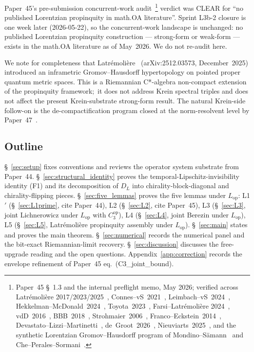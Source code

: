 \documentclass[11pt,a4paper]{article}
\theoremstyle{plain}
\theoremstyle{definition}
\newcommand{\DL}{D_{L}}
\newcommand{\Lop}{L_{\mathrm{op}}}
\newcommand{\Cthreeop}{C_{3}^{\mathrm{op}}}
\begin{document}
Paper~45's pre-submission concurrent-work
audit~\footnote{Paper~45 \S~1.3 and the internal preflight memo, May
2026; verified across Latr\'emoli\`ere
2017/2023/2025~\cite{latremoliere_metric_st_2017,latremoliere2018,farsi_latremoliere2025},
Connes--vS~2021~\cite{connes_vs2021}, Leimbach--vS~2024~\cite{leimbach_vs2024},
Hekkelman--McDonald~2024~\cite{hekkelman_mcdonald2024b},
Toyota~2023~\cite{toyota2023}, Farsi--Latr\'emoli\`ere
2024~\cite{farsi_latremoliere2024}, vdD~2016~\cite{vandungen2016},
BBB~2018~\cite{bizi_brouder_besnard2018}, Strohmaier~2006~\cite{strohmaier2006},
Franco--Eckstein~2014~\cite{franco_eckstein2014},
Devastato--Lizzi--Martinetti~\cite{devastato_lizzi_martinetti2018},
de~Groot~2026~\cite{de_groot2026_su11},
Nieuviarts~2025~\cite{nieuviarts2025a,nieuviarts2025b_proceedings}, and
the synthetic Lorentzian Gromov--Hausdorff program of
Mondino--S\"amann~\cite{minguzzi_suhr2024,mondino_samann2025} and
Che--Perales--Sormani~\cite{che_perales_sormani2025}.}
verdict was CLEAR for ``no published Lorentzian propinquity in math.OA
literature''. Sprint L3b-2 closure is one week later (2026-05-22), so
the concurrent-work landscape is unchanged: no published Lorentzian
propinquity construction --- strong-form or weak-form --- exists in the
math.OA literature as of May~2026. We do not re-audit here.

We note for completeness that
Latr\'emoli\`ere~\cite{latremoliere2025_hypertopology}
(arXiv:2512.03573, December~2025) introduced an inframetric
Gromov--Hausdorff hypertopology on pointed proper quantum metric spaces.
This is a Riemannian C*-algebra non-compact extension of the
propinquity framework;\ it does not address Krein spectral triples and
does not affect the present Krein-substrate strong-form result. The
natural Krein-side follow-on is the de-compactification program closed
at the norm-resolvent level by Paper~47~\cite{paper47}.

\subsection{Outline}\label{sec:outline}

\S~\ref{sec:setup} fixes conventions and reviews the operator system
substrate from Paper~44. \S~\ref{sec:structural_identity} proves the
temporal-Lipschitz-invisibility identity (F1) and its decomposition of
$\DL$ into chirality-block-diagonal and chirality-flipping pieces.
\S~\ref{sec:five_lemmas} proves the five lemmas under $\Lop$: L1$'$
(\S~\ref{sec:L1prime}, cite Paper~44), L2 (\S~\ref{sec:L2}, cite
Paper~45), L3 (\S~\ref{sec:L3}, joint Lichnerowicz under $\Lop$ with
$\Cthreeop$), L4 (\S~\ref{sec:L4}, joint Berezin under $\Lop$), L5
(\S~\ref{sec:L5}, Latr\'emoli\`ere propinquity assembly under $\Lop$).
\S~\ref{sec:main} states and proves the main theorem.
\S~\ref{sec:numerical} records the numerical panel and the bit-exact
Riemannian-limit recovery. \S~\ref{sec:discussion} discusses the
free-upgrade reading and the open questions. Appendix~\ref{app:correction}
records the envelope refinement of Paper~45 eq.~(C3\_joint\_bound).
\end{document}
